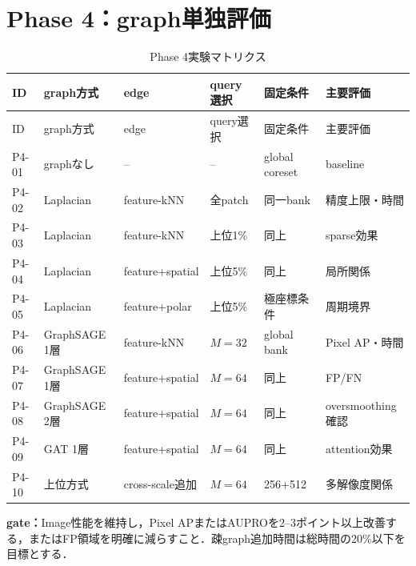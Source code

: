\documentclass[a4paper,11pt]{ltjsarticle}
\begin{document}
\section{Phase 4：graph単独評価}
\begin{landscape}
\begin{longtable}{L{18mm}L{37mm}L{37mm}L{37mm}L{42mm}L{42mm}}
\caption{Phase 4実験マトリクス}\\
\toprule
ID & graph方式 & edge & query選択 & 固定条件 & 主要評価 \\
\midrule
\endfirsthead
\toprule
ID & graph方式 & edge & query選択 & 固定条件 & 主要評価 \\
\midrule
\endhead
P4-01 & graphなし & -- & -- & global coreset & baseline \\
P4-02 & Laplacian & feature-kNN & 全patch & 同一bank & 精度上限・時間 \\
P4-03 & Laplacian & feature-kNN & 上位1\% & 同上 & sparse効果 \\
P4-04 & Laplacian & feature+spatial & 上位5\% & 同上 & 局所関係 \\
P4-05 & Laplacian & feature+polar & 上位5\% & 極座標条件 & 周期境界 \\
P4-06 & GraphSAGE 1層 & feature-kNN & $M=32$ & global bank & Pixel AP・時間 \\
P4-07 & GraphSAGE 1層 & feature+spatial & $M=64$ & 同上 & FP/FN \\
P4-08 & GraphSAGE 2層 & feature+spatial & $M=64$ & 同上 & oversmoothing確認 \\
P4-09 & GAT 1層 & feature+spatial & $M=64$ & 同上 & attention効果 \\
P4-10 & 上位方式 & cross-scale追加 & $M=64$ & 256+512 & 多解像度関係 \\
\bottomrule
\end{longtable}
\end{landscape}
\textbf{gate：}Image性能を維持し，Pixel APまたはAUPROを2--3ポイント以上改善する，またはFP領域を明確に減らすこと．疎graph追加時間は総時間の20\%以下を目標とする．
\end{document}
